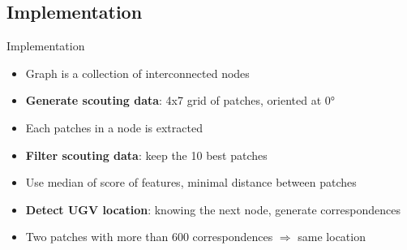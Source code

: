 \documentclass[aspectratio=169,hyperref={pdfpagelabels=false}]{beamer}
\begin{document}
    \subsection{Implementation}
    \begin{frame}{Implementation}
        \begin{itemize}
            \item Graph is a collection of interconnected nodes
            \pause
            \item \textbf{Generate scouting data}: 4x7 grid of patches, oriented at 0°
            \item Each patches in a node is extracted
            \pause
            \item \textbf{Filter scouting data}: keep the 10 best patches
            \item Use median of score of features, minimal distance between patches
            \pause
            \item \textbf{Detect UGV location}: knowing the next node, generate correspondences
            \item Two patches with more than 600 correspondences $\Rightarrow$ same location
        \end{itemize}
    \end{frame}
\end{document}
